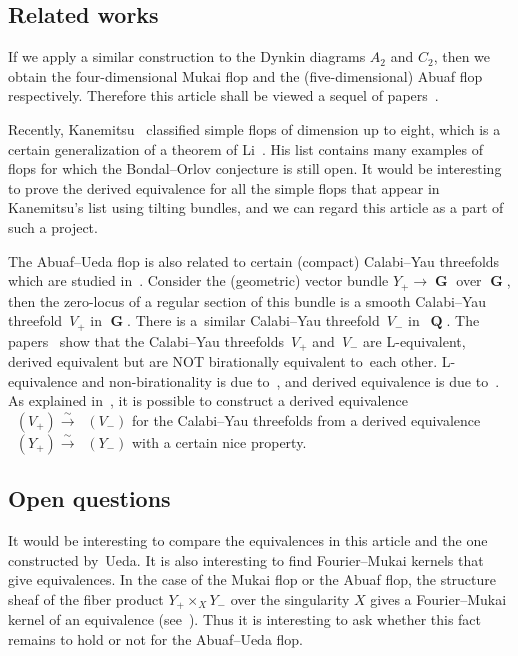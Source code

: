 \documentclass[10pt,a4paper]{amsart}
\DeclareMathOperator{\D}{D^b}
\DeclareMathOperator{\G}{\mathbf{G}}
\DeclareMathOperator{\Q}{\mathbf{Q}}
\numberwithin{equation}{section}
\begin{document}
\subsection{Related works}
If we apply a similar construction to the Dynkin diagrams $A_2$ and $C_2$,
then we obtain the four-dimensional Mukai flop and the (five-dimensional) Abuaf flop~\cite{Seg16} respectively.
Therefore this article shall be viewed a sequel of papers~\cite{H17a, H17b, Seg16}.

Recently, Kanemitsu~\cite{Kan17} classified simple flops of dimension up to eight, which is a certain generalization of a theorem of Li~\cite{Li17}.
His list contains many examples of flops for which the Bondal--Orlov conjecture is still open.
It would be interesting to prove the derived equivalence for all the simple flops that appear in Kanemitsu's list using tilting bundles,
and we can regard this article as a part of such a project.

The Abuaf--Ueda flop is also related to certain (compact) Calabi--Yau threefolds which are studied in~\cite{IMOU16a, IMOU16b, Kuz18}.
Consider the (geometric) vector bundle $Y_+ \to \G$ over $\G$,
then the zero-locus of a regular section of this bundle is a smooth Calabi--Yau threefold~$V_+$ in $\G$.
There is a~similar Calabi--Yau threefold~$V_-$ in~$\Q$.
The papers~\cite{IMOU16b, Kuz18} show that the Calabi--Yau threefolds~$V_+$ and~$V_-$ are L-equivalent, derived equivalent
but are NOT birationally equivalent to~each other.
L-equivalence and non-birationality is due to~\cite{IMOU16b}, and derived equivalence is due to~\cite{Kuz18}.
As explained in~\cite{Ued16}, it is possible to construct a derived equivalence $\D(V_+) \xrightarrow{\sim} \D(V_-)$
for the Calabi--Yau threefolds from a derived equivalence $\D(Y_+) \xrightarrow{\sim} \D(Y_-)$ with a certain nice property.

\subsection{Open questions}
It would be interesting to compare the equivalences in this article and the one constructed by~Ueda.
It is also interesting to find Fourier--Mukai kernels that give equivalences.
In the case of the Mukai flop or the Abuaf flop, the structure sheaf of the fiber product $Y_+ \times_X Y_-$ over the singularity $X$
gives a Fourier--Mukai kernel of an equivalence (see~\cite{H17b, Ka02, Na03}).
Thus it is interesting to ask whether this fact remains to hold or not for the Abuaf--Ueda flop.
\end{document}
